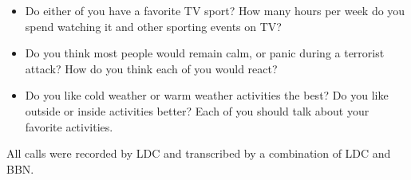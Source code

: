 \documentclass{article}
\begin{document}
\begin{appendices}
\begin{itemize}
                \begin{itemize}
                    \item Do either of you have a favorite TV sport? How many hours per week do you spend watching it and other sporting events on TV?
                    \item Do you think most people would remain calm, or panic during a terrorist attack? How do you think each of you would react?
                    \item Do you like cold weather or warm weather activities the best? Do you like outside or inside activities better? Each of you should talk about your favorite activities.
                \end{itemize}
            All calls were recorded by LDC and transcribed by a combination of LDC and BBN.


\end{itemize}
\end{appendices}
\end{document}

